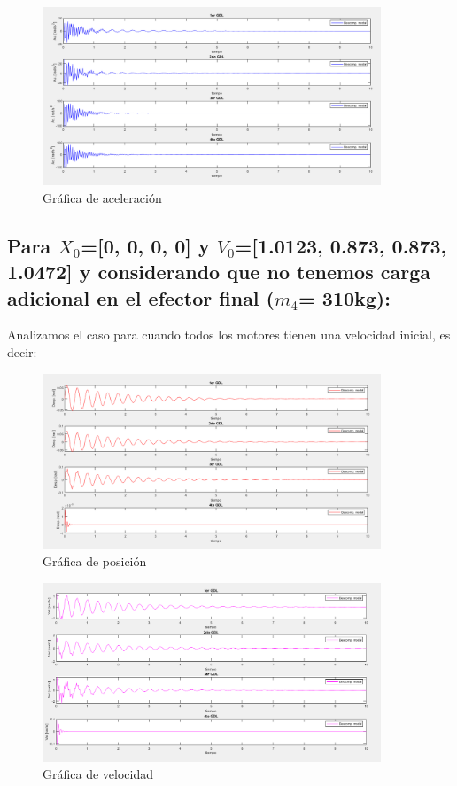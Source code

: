 \documentclass{aleph-revista}
\begin{document}
\begin{figure}[H]
    \centering
    \includegraphics[width=0.90\textwidth]{Imagenes/r12.png}
    \caption{Gráfica de aceleración}
    \label{fig:etiqueta de la figura}
\end{figure}


\subsection{Para $X_0$=[0, 0, 0, 0] y $V_0$=[1.0123, 0.873, 0.873, 1.0472] y considerando que no tenemos carga adicional en el efector final ($m_4$= 310kg):}

Analizamos el caso para cuando todos los motores tienen una velocidad inicial, es decir:

\begin{figure}[H]
    \centering
    \includegraphics[width=0.90\textwidth]{Imagenes/r13.png}
    \caption{Gráfica de posición}
    \label{fig:etiqueta de la figura}
\end{figure}

\begin{figure}[H]
    \centering
    \includegraphics[width=0.90\textwidth]{Imagenes/r14.png}
    \caption{Gráfica de velocidad}
    \label{fig:etiqueta de la figura}
\end{figure}
\end{document}
